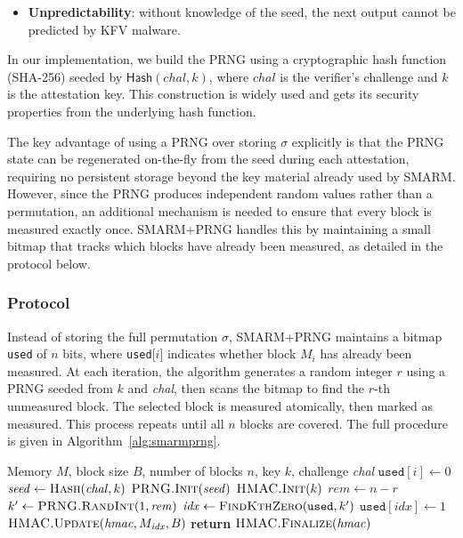 \documentclass[a4paper,10pt]{article}
\begin{document}
{\begin{itemize}
    \item \textbf{Unpredictability}: without knowledge of the 
    seed, the next output cannot be predicted by KFV malware.
\end{itemize}

In our implementation, we build the PRNG using a 
cryptographic hash function (SHA-256) seeded by 
$\mathsf{Hash}(\mathit{chal}, k)$, where $\mathit{chal}$ is 
the verifier's challenge and $k$ is the attestation key. This 
construction is widely used and gets its security properties 
from the underlying hash function.

The key advantage of using a PRNG over storing $\sigma$ 
explicitly is that the PRNG state can be regenerated 
on-the-fly from the seed during each attestation, requiring 
no persistent storage beyond the key material already used by 
SMARM. However, since the PRNG produces independent random 
values rather than a permutation, an additional mechanism is 
needed to ensure that every block is measured exactly once. 
SMARM+PRNG handles this by maintaining a 
small bitmap that tracks which blocks have already been 
measured, as detailed in the protocol below.


\subsubsection{Protocol}

Instead of storing the full permutation $\sigma$, 
SMARM+PRNG maintains a bitmap \texttt{used} of $n$ 
bits, where \texttt{used}[$i$] indicates whether block $M_i$ has 
already been measured. At each iteration, the algorithm generates 
a random integer $r$ using a PRNG seeded from $k$ and \textit{chal}, 
then scans the bitmap to find the $r$-th unmeasured block. The 
selected block is measured atomically, then marked as measured. 
This process repeats until all $n$ blocks are covered. The full 
procedure is given in Algorithm~\ref{alg:smarmprng}.


\begin{algorithm}
\caption{SMARM+PRNG Secure Service}
\label{alg:smarmprng}
\begin{algorithmic}[1]
\Require Memory $M$, block size $B$, number of blocks $n$, 
         key $k$, challenge \textit{chal}
    \State $\texttt{used}[i] \gets 0$
\EndFor
\State $\mathit{seed} \gets \Call{Hash}{\mathit{chal}, k}$
\State $\Call{PRNG.Init}{\mathit{seed}}$
\State $\Call{HMAC.Init}{k}$
    \State $\mathit{rem} \gets n - r$
    \State $k' \gets \Call{PRNG.RandInt}{1, \mathit{rem}}$
    \State $\mathit{idx} \gets \Call{FindKthZero}{\texttt{used}, k'}$
    \State $\texttt{used}[\mathit{idx}] \gets 1$
    \State {}
    \State $\Call{HMAC.Update}{\mathit{hmac}, M_{\mathit{idx}}, B}$
    \State {}
\EndFor
\State \textbf{return} $\Call{HMAC.Finalize}{\mathit{hmac}}$
\end{algorithmic}
\end{algorithm}

}
\end{document}
